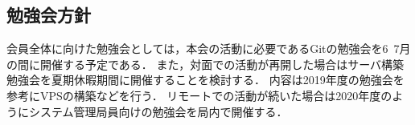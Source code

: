 \subsection*{勉強会方針}


会員全体に向けた勉強会としては，本会の活動に必要であるGitの勉強会を6~7月の間に開催する予定である．
また，対面での活動が再開した場合はサーバ構築勉強会を夏期休暇期間に開催することを検討する．
内容は2019年度の勉強会を参考にVPSの構築などを行う．
リモートでの活動が続いた場合は2020年度のようにシステム管理局員向けの勉強会を局内で開催する．


